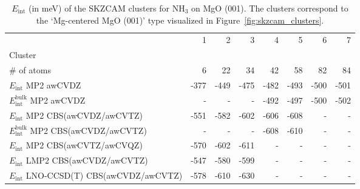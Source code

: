 \begin{table}
\caption{\label{tab:system_eint_mgo_nh3}$E_\textrm{int}$ (in meV) of the SKZCAM clusters for NH$_3$ on MgO (001). The clusters correspond to the `Mg-centered MgO (001)' type visualized in Figure~\ref{fig:skzcam_clusters}.}
\begin{adjustbox}{center,max width=1.4\textwidth}
\begin{tabular}{lrrrrrrr}
\toprule
 & 1 & 2 & 3 & 4 & 5 & 6 & 7 \\ 
Cluster &  &  &  &  &  &  &  \\
\midrule
\# of atoms & 6 & 22 & 34 & 42 & 58 & 82 & 84 \\
$E_\textrm{int}$ MP2 awCVDZ & -377 & -449 & -475 & -482 & -493 & -500 & -501 \\
$E_\textrm{int}^\textrm{bulk}$ MP2 awCVDZ & - & - & - & -492 & -497 & -500 & -502 \\
$E_\textrm{int}$ MP2 CBS(awCVDZ/awCVTZ) & -551 & -582 & -602 & -606 & -608 & - & - \\
$E_\textrm{int}^\textrm{bulk}$ MP2 CBS(awCVDZ/awCVTZ) & - & - & - & -608 & -610 & - & - \\
$E_\textrm{int}$ MP2 CBS(awCVTZ/awCVQZ) & -570 & -602 & -611 & - & - & - & - \\
$E_\textrm{int}$ LMP2 CBS(awCVDZ/awCVTZ) & -547 & -580 & -599 & - & - & - & - \\
$E_\textrm{int}$ LNO-CCSD(T) CBS(awCVDZ/awCVTZ) & -578 & -610 & -630 & - & - & - & - \\
\bottomrule
\end{tabular}
\end{adjustbox}
\end{table}

